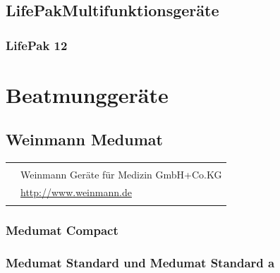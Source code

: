 \TakeNotesLarge

\subsection{LifePak\texttrademark Multifunktionsgeräte}

\subsubsection{LifePak 12}

\TakeNotesLarge{}


\section{Beatmunggeräte}

\subsection{Weinmann Medumat}

\begin{table}[H]
\begin{tabulary}{\linewidth}{LL}
&
\\\addlinespace\midrule\addlinespace
{}
&
Weinmann Geräte für Medizin GmbH+Co.KG
\\\addlinespace
{}
&
\url{http://www.weinmann.de}
\\\addlinespace\bottomrule
\end{tabulary}
\end{table}

\subsubsection{Medumat Compact}

\subsubsection{Medumat Standard und Medumat Standard a}

